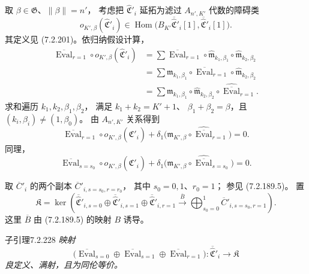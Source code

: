取 $\beta\in\mathfrak G$、$\lVert\beta\rVert=n'$，
考虑把 $\widehat{\mathfrak C}'_i$
延拓为滤过 $A_{n',K'}$ 代数的障碍类
\[
o_{K',\beta}(\widehat{\mathfrak C}'_i)
\in\operatorname{Hom}\bigl(
B_{K'}\overline{\widehat{\mathfrak C}}'_i[1],
\overline{\widehat{\mathfrak C}}'_i[1]
\bigr).
\]
其定义见 (7.2.201)。依归纳假设计算，
\[
\begin{aligned}
\overline{\operatorname{Eval}}_{r=1}\circ
o_{K',\beta}(\widehat{\mathfrak C}'_i)
&=\sum\overline{\operatorname{Eval}}_{r=1}\circ
\widehat{\mathfrak m}_{k_1,\beta_1}
\circ\widehat{\mathfrak m}_{k_2,\beta_2}\\
&=\sum\mathfrak m_{k_1,\beta_1}\circ
\overline{\operatorname{Eval}}_{r=1}\circ
\widehat{\mathfrak m}_{k_2,\beta_2}\\
&=\sum\mathfrak m_{k_1,\beta_1}\circ
\widehat{\mathfrak m}_{k_2,\beta_2}\circ
\widehat{\overline{\operatorname{Eval}}}_{r=1}.
\end{aligned}
\]
求和遍历 $k_1,k_2,\beta_1,\beta_2$，
满足 $k_1+k_2=K'+1$、
$\beta_1+\beta_2=\beta$，且
$(k_i,\beta_i)\ne(1,\beta_0)$。
由 $A_{n',K'}$ 关系得到
\begin{equation}
\overline{\operatorname{Eval}}_{r=1}\circ
o_{K',\beta}(\widehat{\mathfrak C}'_i)
+\delta_1\bigl(
\mathfrak m_{K',\beta}\circ
\widehat{\overline{\operatorname{Eval}}}_{r=1}
\bigr)=0.
\tag{7.2.226.1}\label{eq:7-2-226-1}
\end{equation}
同理，
\begin{equation}
\overline{\operatorname{Eval}}_{s=s_0}\circ
o_{K',\beta}(\widehat{\mathfrak C}'_i)
+\delta_1\bigl(
\mathfrak m_{K',\beta}\circ
\widehat{\overline{\operatorname{Eval}}}_{s=s_0}
\bigr)=0.
\tag{7.2.226.2}\label{eq:7-2-226-2}
\end{equation}

取 $\overline C'_i$ 的两个副本
$\overline C'_{i,s=s_0,r=r_0}$，
其中 $s_0=0,1$、$r_0=1$；
参见 (7.2.189.5)。
置
\begin{equation}
\mathfrak K=\ker\left(
\overline{\widehat{\mathfrak C}}'_{i,s=0}
\oplus\overline{\widehat{\mathfrak C}}'_{i,s=1}
\oplus\overline{\widehat{\mathfrak C}}'_{i,r=1}
\xrightarrow{\overline B}
\bigoplus_{s_0=0}^{1}\overline C'_{i,s=s_0,r=1}
\right).
\tag{7.2.227}\label{eq:7-2-227}
\end{equation}
这里 $\overline B$ 由 (7.2.189.5) 的映射 $B$ 诱导。

\begin{statement}{子引理}{7.2.228}\label{sublem:7-2-228}\itshape
映射
\begin{equation}
\bigl(
\overline{\operatorname{Eval}}_{s=0}
\oplus\overline{\operatorname{Eval}}_{s=1}
\oplus\overline{\operatorname{Eval}}_{r=1}
\bigr)\colon
\overline{\widehat{\mathfrak C}}'_i\longrightarrow\mathfrak K
\tag{7.2.229}\label{eq:7-2-229}
\end{equation}
良定义、满射，且为同伦等价。
\end{statement}


